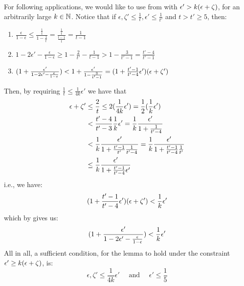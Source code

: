     \begin{remark}[Remark 5.13.1] \label{rmk:value_for_equitable_partition_of_excellent_parts}
        For following applications, we would like to use  from
         with $\epsilon' > k ( \epsilon + \zeta )$, for an arbitrarily large $k \in \mathbb{N}$.
        Notice that if $\epsilon, \zeta' \leq \frac{1}{t}, \epsilon' \leq \frac{1}{t'}$ and $t > t' \geq 5$, then:
        \begin{enumerate}[label=(\alph*), ref=\alph*]
            \item $\frac{\epsilon}{1-\epsilon} \leq \frac{\frac{1}{t}}{1-\frac{1}{t}} = \frac{\frac{1}{t}}{\frac{t-1}{t}}
                = \frac{1}{t-1}$
            \item $1 - 2 \epsilon' - \frac{\epsilon}{1-\epsilon} \geq 1 - \frac{2}{t'} - \frac{1}{t-1} > 1 - \frac{3}{t'-1}
                = \frac{t'-4}{t'-1}$
            \item \label{itm:value_for_equitable_partition_of_excellent_parts.c} $( 1 + \frac{\epsilon'}{1 - 2 \epsilon' - \frac{\epsilon}{1-\epsilon}} )
                < 1 + \frac{\epsilon'}{1 - \frac{3}{t'-1}}
                = ( 1 + \frac{t'-1}{t'-4} \epsilon' ) ( \epsilon + \zeta' )$
        \end{enumerate}
        Then, by requiring $\frac{1}{t} \leq \frac{1}{4k}\epsilon'$ we have that
        \begin{align*}
            \epsilon + \zeta'
                & \leq \frac{2}{t} \leq 2 ( \frac{1}{4k}\epsilon' ) = \frac{1}{2} ( \frac{1}{k}\epsilon' ) \\
                & < \frac{t'-4}{t'- 3} \frac{1}{k} \epsilon' = \frac{1}{k} \frac{\epsilon'}{1 + \frac{1}{t'-4}} \\
                & < \frac{1}{k} \frac{\epsilon'}{1 + \frac{t'-1}{t'}\frac{1}{t'-4}} = \frac{1}{k} \frac{\epsilon'}{1 + \frac{t'-1}{t'-4}\frac{1}{t'}} \\
                & \leq \frac{1}{k} \frac{\epsilon'}{1 + \frac{t'-1}{t'-4}\epsilon'}
        \end{align*}
        i.e., we have:
        \[
            ( 1 + \frac{t'-1}{t'-4} \epsilon' ) ( \epsilon + \zeta' ) < \frac{1}{k} \epsilon'
        \]
        which by  gives us:
        \[
            ( 1 + \frac{\epsilon'}{1 - 2 \epsilon' - \frac{\epsilon}{1-\epsilon}} ) < \frac{1}{k} \epsilon'
        \]
        All in all, a sufficient condition, for the lemma to hold under the constraint $\epsilon' \geq k ( \epsilon + \zeta )$, is:
        \[
            \epsilon, \zeta' \leq \frac{1}{4k} \epsilon' \quad \text{ and } \quad \epsilon' \leq \frac{1}{5}
        \]
    \end{remark}


